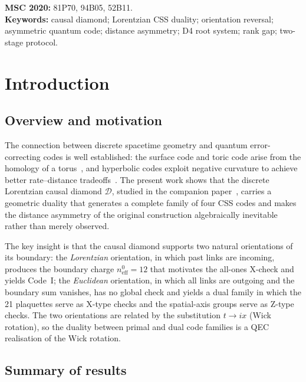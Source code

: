 \documentclass[12pt,a4paper]{article}
\theoremstyle{plain}
\theoremstyle{definition}
\theoremstyle{remark}
\newcommand{\CD}{\mathscr{D}}
\begin{document}
\tableofcontents
\bigskip

\noindent\textbf{MSC 2020:} 81P70, 94B05, 52B11.\\[2pt]
\textbf{Keywords:} causal diamond; Lorentzian CSS duality; orientation
reversal; asymmetric quantum code; distance asymmetry; D4 root system;
rank gap; two-stage protocol.

\section{Introduction}\label{sec:intro}

\subsection{Overview and motivation}

The connection between discrete spacetime geometry and quantum
error-correcting codes is well established: the surface code and toric
code arise from the homology of a torus~\cite{Fowler2012}, and hyperbolic
codes exploit negative curvature to achieve better rate--distance
tradeoffs~\cite{Panteleev2022,Leverrier2022}.
The present work shows that the discrete Lorentzian causal diamond
$\CD$, studied in the companion paper~\cite{SchmittCD}, carries a
geometric duality that generates a complete family of four CSS codes
and makes the distance asymmetry of the original construction
algebraically inevitable rather than merely observed.

The key insight is that the causal diamond supports two natural
orientations of its boundary: the \emph{Lorentzian} orientation, in
which past links are incoming, produces the boundary charge
$n_{\mathrm{eff}}^0 = 12$ that motivates the all-ones X-check and
yields Code~I; the \emph{Euclidean} orientation, in which all links
are outgoing and the boundary sum vanishes, has no global check and
yields a dual family in which the 21 plaquettes serve as X-type checks
and the spatial-axis groups serve as Z-type checks.
The two orientations are related by the substitution $t\to ix$ (Wick
rotation), so the duality between primal and dual code families is a
QEC realisation of the Wick rotation.

\subsection{Summary of results}
\end{document}
